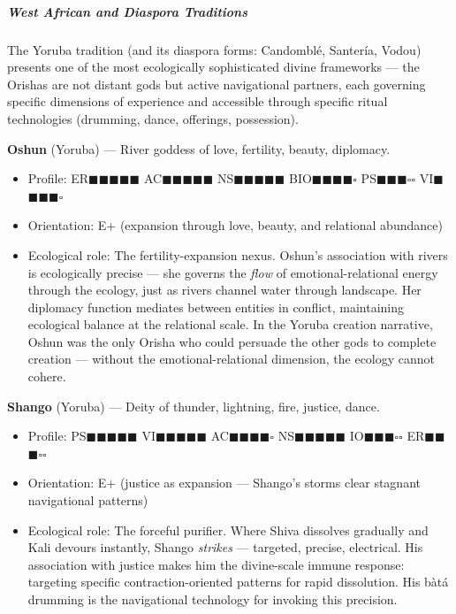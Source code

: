 \subparagraph*{West African and Diaspora Traditions}


The Yoruba tradition (and its diaspora forms: Candomblé, Santería, Vodou) presents one of the most ecologically sophisticated divine frameworks — the Orishas are not distant gods but active navigational partners, each governing specific dimensions of experience and accessible through specific ritual technologies (drumming, dance, offerings, possession).


\textbf{Oshun} (Yoruba) — River goddess of love, fertility, beauty, diplomacy.

\begin{itemize}[nosep,leftmargin=*]
  \item Profile: ER$\blacksquare$$\blacksquare$$\blacksquare$$\blacksquare$$\blacksquare$ AC$\blacksquare$$\blacksquare$$\blacksquare$$\blacksquare$$\blacksquare$ NS$\blacksquare$$\blacksquare$$\blacksquare$$\blacksquare$$\blacksquare$ BIO$\blacksquare$$\blacksquare$$\blacksquare$$\blacksquare$$\square$ PS$\blacksquare$$\blacksquare$$\blacksquare$$\square$$\square$ VI$\blacksquare$$\blacksquare$$\blacksquare$$\blacksquare$$\square$
  \item Orientation: E+ (expansion through love, beauty, and relational abundance)
  \item Ecological role: The fertility-expansion nexus. Oshun's association with rivers is ecologically precise — she governs the \textit{flow} of emotional-relational energy through the ecology, just as rivers channel water through landscape. Her diplomacy function mediates between entities in conflict, maintaining ecological balance at the relational scale. In the Yoruba creation narrative, Oshun was the only Orisha who could persuade the other gods to complete creation — without the emotional-relational dimension, the ecology cannot cohere.
\end{itemize}


\textbf{Shango} (Yoruba) — Deity of thunder, lightning, fire, justice, dance.

\begin{itemize}[nosep,leftmargin=*]
  \item Profile: PS$\blacksquare$$\blacksquare$$\blacksquare$$\blacksquare$$\blacksquare$ VI$\blacksquare$$\blacksquare$$\blacksquare$$\blacksquare$$\blacksquare$ AC$\blacksquare$$\blacksquare$$\blacksquare$$\blacksquare$$\square$ NS$\blacksquare$$\blacksquare$$\blacksquare$$\blacksquare$$\blacksquare$ IO$\blacksquare$$\blacksquare$$\blacksquare$$\square$$\square$ ER$\blacksquare$$\blacksquare$$\blacksquare$$\square$$\square$
  \item Orientation: E+ (justice as expansion — Shango's storms clear stagnant navigational patterns)
  \item Ecological role: The forceful purifier. Where Shiva dissolves gradually and Kali devours instantly, Shango \textit{strikes} — targeted, precise, electrical. His association with justice makes him the divine-scale immune response: targeting specific contraction-oriented patterns for rapid dissolution. His bàtá drumming is the navigational technology for invoking this precision.
\end{itemize}



